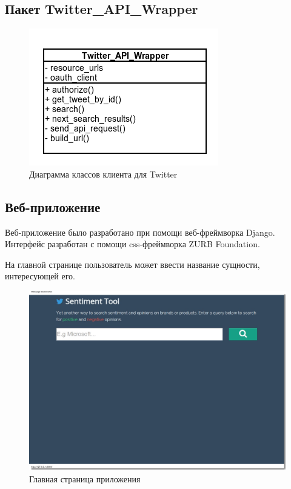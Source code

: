 \clearpage{}

\subsection{Пакет Twitter\_API\_Wrapper}
\begin{figure}[!h]
\begin{center}
\includegraphics[scale=0.6, clip]{../resources/uml/twitter_classes.png}
\caption{Диаграмма классов клиента для Twitter}
\label{gr:preprocessors}
\end{center}
\end{figure} 

\subsection{Веб-приложение}
Веб-приложение было разработано при помощи веб-фреймворка Django.
Интерфейс разработан с помощи css-фреймворка ZURB Foundation.

На главной странице пользователь может ввести название
сущности, интересующей его. 
\begin{figure}[!ht]
\begin{center}
\includegraphics[scale=0.4, trim=20mm 60mm 20mm 10mm, clip]{../resources/screens/main.png}
\caption{Главная страница приложения}
\label{gr:mainpage}
\end{center}
\end{figure} 


